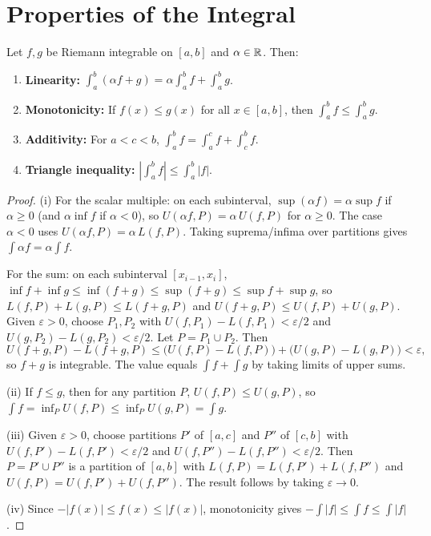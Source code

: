 \documentclass[11pt,a4paper]{article}
\begin{document}
\section{Properties of the Integral}
\label{sec:integral_props}

\begin{theorem}
\label{thm:integral_props}
Let $f, g$ be Riemann integrable on $[a, b]$ and $\alpha \in \mathbb{R}$. Then:
\begin{enumerate}[nosep,label=(\roman*)]
  \item \textbf{Linearity:}
    $\int_a^b (\alpha f + g) = \alpha \int_a^b f + \int_a^b g$.
  \item \textbf{Monotonicity:} If $f(x) \le g(x)$ for all
    $x \in [a, b]$, then $\int_a^b f \le \int_a^b g$.
  \item \textbf{Additivity:} For $a < c < b$,
    $\int_a^b f = \int_a^c f + \int_c^b f$.
  \item \textbf{Triangle inequality:}
    $\left|\int_a^b f\right| \le \int_a^b |f|$.
\end{enumerate}
\end{theorem}

\begin{proof}
(i) For the scalar multiple: on each subinterval, $\sup(\alpha f) =
\alpha \sup f$ if $\alpha \ge 0$ (and $\alpha \inf f$ if $\alpha < 0$),
so $U(\alpha f, P) = \alpha\, U(f, P)$ for $\alpha \ge 0$. The case
$\alpha < 0$ uses $U(\alpha f, P) = \alpha\, L(f, P)$. Taking
suprema/infima over partitions gives
$\int \alpha f = \alpha \int f$.

For the sum: on each subinterval $[x_{i-1}, x_i]$,
$\inf f + \inf g \le \inf(f + g) \le \sup(f + g) \le \sup f + \sup g$,
so $L(f, P) + L(g, P) \le L(f+g, P)$ and
$U(f+g, P) \le U(f, P) + U(g, P)$. Given $\varepsilon > 0$, choose
$P_1, P_2$ with $U(f, P_1) - L(f, P_1) < \varepsilon/2$ and
$U(g, P_2) - L(g, P_2) < \varepsilon/2$. Let $P = P_1 \cup P_2$. Then
\[
  U(f+g, P) - L(f+g, P) \le \bigl(U(f, P) - L(f, P)\bigr)
  + \bigl(U(g, P) - L(g, P)\bigr) < \varepsilon,
\]
so $f + g$ is integrable. The value equals $\int f + \int g$ by
taking limits of upper sums.

(ii) If $f \le g$, then for any partition $P$,
$U(f, P) \le U(g, P)$, so $\int f = \inf_P U(f, P) \le \inf_P U(g, P)
= \int g$.

(iii) Given $\varepsilon > 0$, choose partitions $P'$ of $[a, c]$ and
$P''$ of $[c, b]$ with $U(f, P') - L(f, P') < \varepsilon/2$ and
$U(f, P'') - L(f, P'') < \varepsilon/2$. Then $P = P' \cup P''$ is a
partition of $[a, b]$ with $L(f, P) = L(f, P') + L(f, P'')$ and
$U(f, P) = U(f, P') + U(f, P'')$. The result follows by taking
$\varepsilon \to 0$.

(iv) Since $-|f(x)| \le f(x) \le |f(x)|$, monotonicity gives
$-\int |f| \le \int f \le \int |f|$.
\end{proof}
\end{document}
